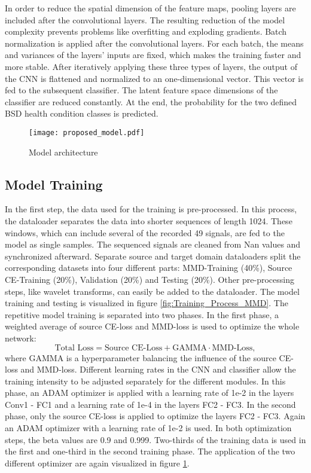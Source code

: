 In order to reduce the spatial dimension of the feature maps, pooling layers are included after the convolutional layers. The resulting reduction of the model complexity prevents problems like overfitting and exploding gradients. Batch normalization is applied after the convolutional layers. For each batch, the means and variances of the layers' inputs are fixed, which makes the training faster and more stable. After iteratively applying these three types of layers, the output of the CNN is flattened and normalized to an one-dimensional vector. This vector is fed to the subsequent classifier. The latent feature space dimensions of the classifier are reduced constantly. At the end, the probability for the two defined BSD health condition classes is predicted.


\begin{figure}[H]
  \centering
  \texttt{[image: proposed\_model.pdf]}
  \caption {Model architecture} \label{fig:proposed_model}
\end{figure}


\subsection{Model Training} \label{sec:Proposed_training}

In the first step, the data used for the training is pre-processed. In this process, the dataloader separates the data into shorter sequences of length 1024. These windows, which can include several of the recorded 49 signals, are fed to the model as single samples. The sequenced signals are cleaned from Nan values and synchronized afterward. Separate source and target domain dataloaders split the corresponding datasets into four different parts: MMD-Training (40\%), Source CE-Training (20\%), Validation (20\%) and Testing (20\%). Other pre-processing steps, like wavelet transforms, can easily be added to the dataloader. The model training and testing is visualized in figure \ref{fig:Training_Process_MMD}. The repetitive model training is separated into two phases. In the first phase, a weighted average of source CE-loss and MMD-loss is used to optimize the whole network: 
\begin{equation}
    \mbox{Total Loss} = \mbox{Source CE-Loss} + \mbox{GAMMA} \cdot \mbox{MMD-Loss}, 
\end{equation}
where GAMMA is a hyperparameter balancing the influence of the source CE-loss and MMD-loss. Different learning rates in the CNN and classifier allow the training intensity to be adjusted separately for the different modules. In this phase, an ADAM optimizer is applied with a learning rate of 1e-2 in the layers Conv1 - FC1 and a learning rate of 1e-4 in the layers FC2 - FC3. In the second phase, only the source CE-loss is applied to optimize the layers FC2 - FC3. Again an ADAM optimizer with a learning rate of 1e-2 is used. In both optimization steps, the beta values are 0.9 and 0.999. Two-thirds of the training data is used in the first and one-third in the second training phase. The application of the two different optimizer are again visualized in figure \ref{fig:proposed_model}.

